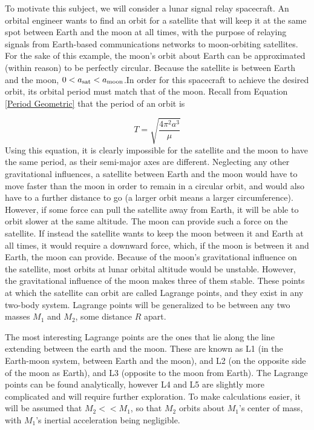 \documentclass[../basicOrbitalDynamics.tex]{subfiles}
\begin{document}
To motivate this subject, we will consider a lunar signal relay spacecraft. An orbital engineer wants to find an orbit for a satellite that will keep it at the same spot between Earth and the moon at all times, with the purpose of relaying signals from Earth-based communications networks to moon-orbiting satellites. For the sake of this example, the moon's orbit about Earth can be approximated (within reason) to be perfectly circular. Because the satellite is between Earth and the moon, $0<{a}_\text{sat}<{a}_\text{moon}$.In order for this spacecraft to achieve the desired orbit, its orbital period must match that of the moon. Recall from Equation \eqref{Period Geometric} that the period of an orbit is

$$T=\sqrt{\frac{4\pi^2 a^3}{\mu}}$$
Using this equation, it is clearly impossible for the satellite and the moon to have the same period, as their semi-major axes are different. Neglecting any other gravitational influences, a satellite between Earth and the moon would have to move faster than the moon in order to remain in a circular orbit, and would also have to a further distance to go (a larger orbit means a larger circumference). However, if some force can pull the satellite away from Earth, it will be able to orbit slower at the same altitude. The moon can provide such a force on the satellite. If instead the satellite wants to keep the moon between it and Earth at all times, it would require a downward force, which, if the moon is between it and Earth, the moon can provide. Because of the moon's gravitational influence on the satellite, most orbits at lunar orbital altitude would be unstable. However, the gravitational influence of the moon makes three of them stable. These points at which the satellite can orbit are called Lagrange points, and they exist in any two-body system. Lagrange points will be generalized to be between any two masses $M_1$ and $M_2$, some distance $R$ apart.

The most interesting Lagrange points are the ones that lie along the line extending between the earth and the moon. These are known as L1 (in the Earth-moon system, between Earth and the moon), and L2 (on the opposite side of the moon as Earth), and L3 (opposite to the moon from Earth). The Lagrange points can be found analytically, however L4 and L5 are slightly more complicated and will require further exploration. To make calculations easier, it will be assumed that $M_2<<M_1$, so that $M_2$ orbits about $M_1$'s center of mass, with $M_1$'s inertial acceleration being negligible.
\end{document}
